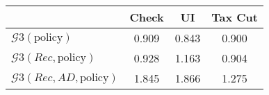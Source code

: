 \begin{tabular}{@{}lccc@{}}
\toprule
                          & Check      & UI    & Tax Cut    \\  \midrule
$\mathcal{G}3(\text{policy})$ & 0.909  & 0.843  & 0.900     \\
$\mathcal{G}3(Rec,\text{policy})$ & 0.928  & 1.163  & 0.904     \\
$\mathcal{G}3(Rec, AD,\text{policy})$ & 1.845  & 1.866  & 1.275     \\
\end{tabular}
